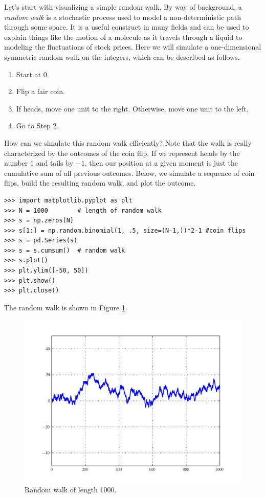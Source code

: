 Let's start with visualizing a simple random walk. By way of background, a \emph{random walk} is a
stochastic process used to model a non-deterministic path through some space. It is a useful construct in
many fields and can be used to explain things like the motion of a molecule as it travels through a liquid to modeling the fluctuations
of stock prices. Here we will simulate a one-dimensional symmetric random walk on the integers, which can be
described as follows.
\begin{enumerate}
  \item Start at 0.
  \item Flip a fair coin.
  \item If heads, move one unit to the right. Otherwise, move one unit to the left.
  \item Go to Step 2.
\end{enumerate}
How can we simulate this random walk efficiently? Note that the walk is really characterized by the outcomes
of the coin flip. If we represent heads by the number $1$ and tails by $-1$, then our position at a given moment
is just the cumulative sum of all previous outcomes. Below, we simulate a sequence of coin flips, build the
resulting random walk, and plot the outcome.
\begin{lstlisting}
>>> import matplotlib.pyplot as plt
>>> N = 1000        # length of random walk
>>> s = np.zeros(N)
>>> s[1:] = np.random.binomial(1, .5, size=(N-1,))*2-1 #coin flips
>>> s = pd.Series(s)
>>> s = s.cumsum()  # random walk
>>> s.plot()
>>> plt.ylim([-50, 50])
>>> plt.show()
>>> plt.close()
\end{lstlisting}

The random walk is shown in Figure \ref{fig:PandasRandomWalk}.

\begin{figure}
\centering
\includegraphics[width=.7 \textwidth]{randomWalk.pdf}
\caption{Random walk of length 1000.}
\label{fig:PandasRandomWalk}
\end{figure}

